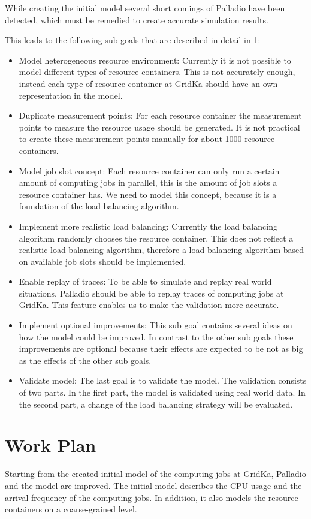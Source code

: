 While creating the initial model several short comings of Palladio have been detected, which must be remedied to create accurate simulation results. 

This leads to the following sub goals that are described in detail in \cref{plan}: 
\begin{itemize}
	\item Model heterogeneous resource environment: Currently it is not possible to model different types of resource containers. This is not accurately enough, instead each type of resource container at GridKa should have an own representation in the model.
	\item Duplicate measurement points: For each resource container the measurement points to measure the resource usage should be generated. It is not practical to create these measurement points manually for about 1000 resource containers.
	\item Model job slot concept: Each resource container can only run a certain amount of computing jobs in parallel, this is the amount of job slots a resource container has. We need to model this concept, because it is a foundation of the load balancing algorithm.
	\item Implement more realistic load balancing: Currently the load balancing algorithm randomly chooses the resource container. This does not reflect a realistic load balancing algorithm, therefore a load balancing algorithm based on available job slots should be implemented.
	\item Enable replay of traces: To be able to simulate and replay real world situations, Palladio should be able to replay traces of computing jobs at GridKa. This feature enables us to make the validation more accurate.
	\item Implement optional improvements: This sub goal contains several ideas on how the model could be improved. In contrast to the other sub goals these improvements are optional because their effects are expected to be not as big as the effects of the other sub goals. 
	\item Validate model: The last goal is to validate the model. The validation consists of two parts. In the first part, the model is validated using real world data. In the second part, a change of the load balancing strategy will be evaluated.
\end{itemize}


\chapter{Work Plan}
\label{plan}
Starting from the created initial model of the computing jobs at GridKa, Palladio and the model are improved.
The initial model describes the CPU usage and the arrival frequency of the computing jobs. In addition, it also models the resource containers on a coarse-grained level.

